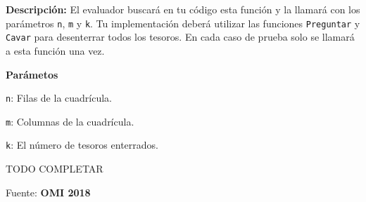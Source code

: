 \textbf{Descripción:} El evaluador buscará en tu código esta función y la llamará con los parámetros \verb|n|, \verb|m| y \verb|k|. Tu implementación deberá utilizar las funciones \verb|Preguntar| y \verb|Cavar| para desenterrar todos los tesoros. En cada caso de prueba solo se llamará a esta función una vez.

\textbf{Parámetos}
\vspace{-\baselineskip}
\begin{plimits}
	\item \verb|n|: Filas de la cuadrícula.
	\item \verb|m|: Columnas de la cuadrícula.
	\item \verb|k|:  El número de tesoros enterrados.
\end{plimits}

TODO COMPLETAR

Fuente: \textbf{OMI 2018}
 

\problembreak